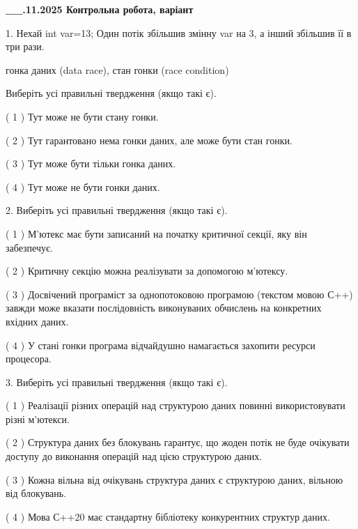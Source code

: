 \documentclass[12pt, ukrainian]{article}
\begin{document}
\newpage
\begin {large}

\textbf{\_\_.11.2025 Контрольна робота, варіант  }\par


{
1. Нехай int var=13; Один потік збільшив змінну var на 3, а інший збільшив її в три рази.

гонка даних (data race), стан гонки (race condition)

Виберіть усі правильні твердження (якщо такі є).\par
\vspace{2mm}
( 1 ) Тут може не бути стану гонки.%

( 2 ) Тут гарантовано нема гонки даних, але може бути стан гонки.%

( 3 ) Тут може бути тільки гонка даних.%

( 4 ) Тут може не бути гонки даних.%


2. Виберіть усі правильні твердження (якщо такі є).\par
\vspace{2mm}

( 1 ) М’ютекс має бути записаний на початку критичної секції, яку він забезпечує.%

( 2 ) Критичну секцію можна реалізувати за допомогою м’ютексу.%

( 3 ) Досвічений програміст за однопотоковою програмою (текстом мовою С++) завжди може вказати послідовність виконуваних обчислень на конкретних вхідних даних.%

( 4 ) У стані гонки програма відчайдушно намагається захопити ресурси процесора.%


3. Виберіть усі правильні твердження (якщо такі є).\par
\vspace{2mm}

( 1 ) Реалізації різних операцій над структурою даних повинні використовувати різні м’ютекси.%

( 2 ) Структура даних без блокувань гарантує, що жоден потік не буде очікувати доступу до виконання операцій над цією структурою даних.%

( 3 ) Кожна вільна від очікувань структура даних є структурою даних, вільною від блокувань.%

( 4 ) Мова С++20 має стандартну бібліотеку конкурентних структур даних.%


}
\end{large}
\end{document}
